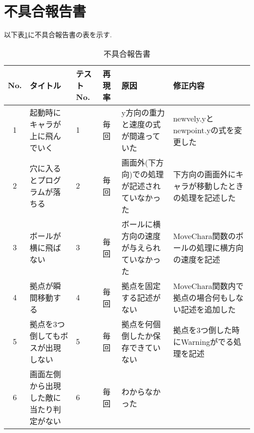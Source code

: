 \documentclass{jarticle}
\begin{document}
\section{不具合報告書}
以下表\ref{table:huguai}に不具合報告書の表を示す.
\begin{table}[H]
  \centering
  \caption{不具合報告書}
  \begin{tabular}{|c|p{2cm}|p{2cm}|p{2cm}|p{2cm}|p{2cm}|} \hline
    No. & タイトル & テストNo. & 再現率 & 原因 & 修正内容 \\ \hline
	 1 & 起動時にキャラが上に飛んでいく & 1 & 毎回 & y方向の重力と速度の式が間違っていた& newvely.yとnewpoint.yの式を変更した  \\ \hline
    2 & 穴に入るとプログラムが落ちる & 2 & 毎回 & 画面外(下方向)での処理が記述されていなかった &下方向の画面外にキャラが移動したときの処理を記述した   \\ \hline
	 3 & ボールが横に飛ばない & 3 & 毎回 & ボールに横方向の速度が与えられていなかった & MoveChara関数のボールの処理に横方向の速度を記述 \\ \hline
	 4 & 拠点が瞬間移動する & 4 & 毎回 & 拠点を固定する記述がない & MoveChara関数内で拠点の場合何もしない記述を追加した  \\ \hline
	 5 &  拠点を3つ倒してもボスが出現しない & 5 & 毎回 & 拠点を何個倒したか保存できていない & 拠点を3つ倒した時にWarningがでる処理を記述 \\ \hline
	 6 &画面左側から出現した敵に当たり判定がない & 6 & 毎回 & わからなかった &   \\ \hline 
  \end{tabular}
  \label{table:huguai}
\end{table}
\end{document}
